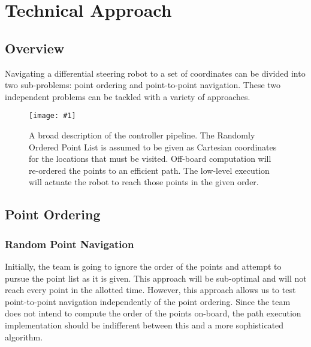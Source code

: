 \documentclass[12pt,conference,onecolumn]{IEEEtran} %
\newcommand{\myfigure}[4]{
  \begin{figure}[h!]
      \centering
      \texttt{[image: \#1]}
      \caption{#2}
\label{#4}
    \end{figure}
}
\begin{document}
\section{Technical Approach}

\subsection{Overview}
Navigating a differential steering robot to a set of coordinates can be divided into two sub-problems: point ordering and point-to-point navigation. These two independent problems can be tackled with a variety of approaches.

\myfigure{images/Pipeline.jpg}{A broad description of the controller pipeline. The Randomly Ordered Point List is assumed to be given as Cartesian coordinates for the locations that must be visited. Off-board computation will re-ordered the points to an efficient path. The low-level execution will actuate the robot to reach those points in the given order.}{0.5}{fig:pipeline}

\subsection{Point Ordering}
\subsubsection{Random Point Navigation}
Initially, the team is going to ignore the order of the points and attempt to pursue the point list as it is given. This approach will be sub-optimal and will not reach every point in the allotted time. However, this approach allows us to test point-to-point navigation independently of the point ordering. Since the team does not intend to compute the order of the points on-board, the path execution implementation should be indifferent between this and a more sophisticated algorithm.
\end{document}
